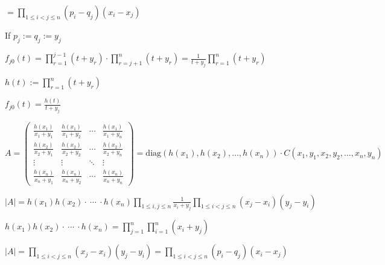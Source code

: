 \documentclass{article}
\begin{document}
$= \prod_{1 \leq i < j \leq n} (p_i - q_j)(x_i-x_j)$

If $p_j := q_j := y_j$

$f_{j0}(t) = \prod_{r=1}^{j-1}(t+y_r) \cdot \prod_{r=j+1}^{n}(t+y_r) = \frac{1}{t+y_j} \prod_{r=1}^{n}(t+y_r)$

$h(t) := \prod_{r=1}^{n}(t+y_r)$

$f_{j0}(t) = \frac{h(t)}{t+y_j}$

$A = \left(\begin{matrix}\frac{h(x_1)}{x_1+y_1} & \frac{h(x_1)}{x_1+y_2} & \cdots & \frac{h(x_1)}{x_1+y_n} \\ \frac{h(x_2)}{x_2+y_1} & \frac{h(x_2)}{x_2+y_2} & \cdots & \frac{h(x_2)}{x_2+y_n} \\ \vdots & \vdots & \ddots & \vdots \\ \frac{h(x_n)}{x_n+y_1} & \frac{h(x_n)}{x_n+y_2} & \cdots & \frac{h(x_n)}{x_n+y_n} \end{matrix}\right) = \mathrm{diag}(h(x_1),h(x_2),\ldots,h(x_n)) \cdot C(x_1,y_1,x_2,y_2,\ldots,x_n, y_n)$

$|A| = h(x_1)h(x_2) \cdot\ \cdots\ \cdot h(x_n) \prod_{1 \leq i,j \leq n}\frac{1}{x_i+y_j} \prod_{1 \leq i < j \leq n} (x_j-x_i)(y_j-y_i)$

$h(x_1)h(x_2) \cdot\ \cdots\ \cdot h(x_n) = \prod_{j=1}^n\prod_{i=1}^n(x_i + y_j)$

$|A| = \prod_{1 \leq i < j \leq n} (x_j-x_i)(y_j-y_i) = \prod_{1 \leq i < j \leq n} (p_i-q_j)(x_i-x_j)$
\end{document}
